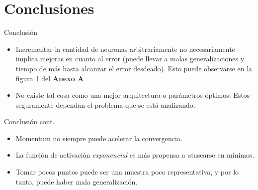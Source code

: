 \documentclass{beamer}
\begin{document}
\section{Conclusiones}
\begin{frame}{Conclusión}

\begin{itemize}
\item Incrementar la cantidad de neuronas arbitrariamente no necesariamente 
implica mejoras en cuanto al error (puede llevar a malas generalizaciones y tiempo de más 
hasta alcanzar el error desdeado). Esto puede observarse en la figura 1 del \textbf{Anexo A}\\
\item No existe tal cosa como una mejor arquitectura o parámetros óptimos. Estos seguramente dependan 
el problema que se está analizando.\\
\end{itemize}

\end{frame}

\begin{frame}{Conclusión cont.}
\begin{itemize}

\item Momentum no siempre puede acelerar la convergencia.\\
\item La función de activación \textit{exponencial} es más propensa a atascarse en mínimos.
\item Tomar pocos puntos puede ser una muestra poco representativa, y por lo tanto, puede haber 
mala generalización.\\
\end{itemize}
\end{frame}
\end{document}
